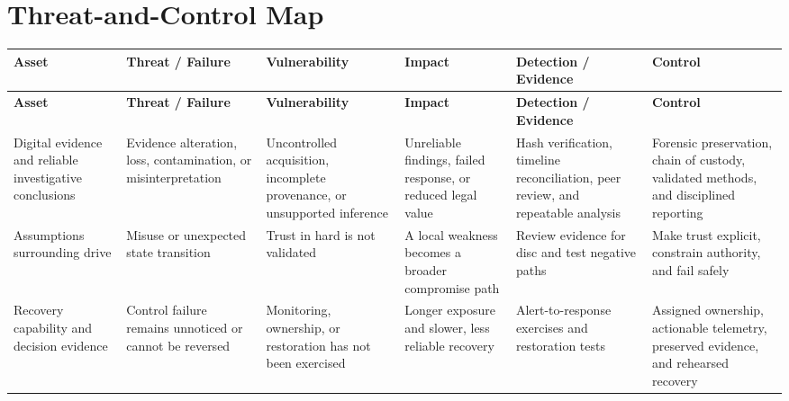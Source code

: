 \documentclass[11pt,letterpaper]{article}
\begin{document}
\section*{Threat-and-Control Map}
\begingroup\scriptsize\setlength{\tabcolsep}{2pt}
\begin{longtable}{>{\raggedright\arraybackslash}p{}>{\raggedright\arraybackslash}p{}>{\raggedright\arraybackslash}p{}>{\raggedright\arraybackslash}p{}>{\raggedright\arraybackslash}p{}>{\raggedright\arraybackslash}p{}}
\toprule\rowcolor{Navy}\color{white}\textbf{Asset} & \color{white}\textbf{Threat / Failure} & \color{white}\textbf{Vulnerability} & \color{white}\textbf{Impact} & \color{white}\textbf{Detection / Evidence} & \color{white}\textbf{Control}\\\midrule
\endfirsthead
\toprule\rowcolor{Navy}\color{white}\textbf{Asset} & \color{white}\textbf{Threat / Failure} & \color{white}\textbf{Vulnerability} & \color{white}\textbf{Impact} & \color{white}\textbf{Detection / Evidence} & \color{white}\textbf{Control}\\\midrule
\endhead
Digital evidence and reliable investigative conclusions & Evidence alteration, loss, contamination, or misinterpretation & Uncontrolled acquisition, incomplete provenance, or unsupported inference & Unreliable findings, failed response, or reduced legal value & Hash verification, timeline reconciliation, peer review, and repeatable analysis & Forensic preservation, chain of custody, validated methods, and disciplined reporting\\\midrule
Assumptions surrounding drive & Misuse or unexpected state transition & Trust in hard is not validated & A local weakness becomes a broader compromise path & Review evidence for disc and test negative paths & Make trust explicit, constrain authority, and fail safely\\\midrule
Recovery capability and decision evidence & Control failure remains unnoticed or cannot be reversed & Monitoring, ownership, or restoration has not been exercised & Longer exposure and slower, less reliable recovery & Alert-to-response exercises and restoration tests & Assigned ownership, actionable telemetry, preserved evidence, and rehearsed recovery\\\midrule
\bottomrule
\end{longtable}
\endgroup
\end{document}
